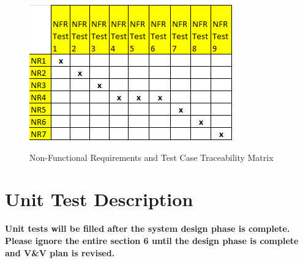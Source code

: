 \documentclass[12pt, titlepage]{article}
\begin{document}
\begin{figure}[!h]
\centering
\includegraphics{nfr_mat.png}\\
\caption{Non-Functional Requirements and Test Case Traceability Matrix}
\end{figure}

\newpage

\section{Unit Test Description}
\textbf{Unit tests will be filled after the system design phase is complete. Please ignore the entire section 6 until the design phase is complete and V\&V plan is revised.}


\end{document}
